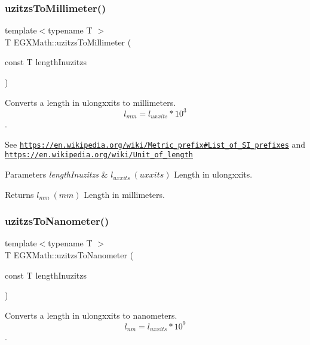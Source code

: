 \subsubsection{\texorpdfstring{uzitzs\+To\+Millimeter()}{uzitzsToMillimeter()}}
{\footnotesize\ttfamily template$<$typename T $>$ \\
T E\+G\+X\+Math\+::uzitzs\+To\+Millimeter (\begin{DoxyParamCaption}\item[{const T}]{length\+Inuzitzs }\end{DoxyParamCaption})}



Converts a length in ulongxxits to millimeters. \[ l_{mm}=l_{uxxits} * 10^{3} \]. 

See \href{https://en.wikipedia.org/wiki/Metric_prefix#List_of_SI_prefixes}{\tt https\+://en.\+wikipedia.\+org/wiki/\+Metric\+\_\+prefix\#\+List\+\_\+of\+\_\+\+S\+I\+\_\+prefixes} and \href{https://en.wikipedia.org/wiki/Unit_of_length}{\tt https\+://en.\+wikipedia.\+org/wiki/\+Unit\+\_\+of\+\_\+length} 
\begin{DoxyParams}{Parameters}
{\em length\+Inuzitzs} & $ l_{uxxits}\ (uxxits)$ Length in ulongxxits. \\
\hline
\end{DoxyParams}
\begin{DoxyReturn}{Returns}
$ l_{mm}\ (mm)$ Length in millimeters. 
\end{DoxyReturn}
\mbox{\label{group___e_g_x_math-_conversions-_length_conversions-_non-_s_i-uzitzs-_s_i_ga6c21ffa2ef282d817d349c249eaaa21f}} 
\subsubsection{\texorpdfstring{uzitzs\+To\+Nanometer()}{uzitzsToNanometer()}}
{\footnotesize\ttfamily template$<$typename T $>$ \\
T E\+G\+X\+Math\+::uzitzs\+To\+Nanometer (\begin{DoxyParamCaption}\item[{const T}]{length\+Inuzitzs }\end{DoxyParamCaption})}



Converts a length in ulongxxits to nanometers. \[ l_{nm}=l_{uxxits} * 10^{9} \]. 

